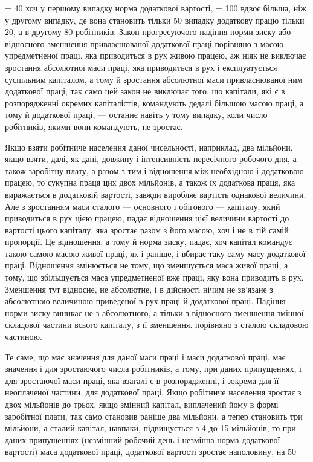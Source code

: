 = 40%
хоч у першому випадку норма додаткової вартості, = 100%
вдвоє більша, ніж у другому випадку, де вона становить тільки
50%
випадку додаткову працю тільки 20, а в другому 80 робітників.
Закон прогресуючого падіння норми зиску або відносного
зменшення привласнюваної додаткової праці порівняно з масою
упредметненої праці, яка приводиться в рух живою працею, аж
ніяк не виключає зростання абсолютної маси праці, яка приводиться
в рух і експлуатується суспільним капіталом, а тому й зростання
абсолютної маси привласнюваної ним додаткової праці; так само
цей закон не виключає того, що капітали, які є в розпорядженні
окремих капіталістів, командують дедалі більшою масою праці,
а тому й додаткової праці, — останнє навіть у тому випадку,
коли число робітників, якими вони командують, не зростає.

Якщо взяти робітниче населення даної чисельності, наприклад,
два мільйони, якщо взяти, далі, як дані, довжину і інтенсивність
пересічного робочого дня, а також заробітну плату,
а разом з тим і відношення між необхідною і додатковою працею,
то сукупна праця цих двох мільйонів, а також їх додаткова
праця, яка виражається в додатковій вартості, завжди виробляє
вартість однакової величини. Але з зростанням маси сталого
— основного і обігового — капіталу, який приводиться в рух
цією працею, падає відношення цієї величини вартості до вартості
цього капіталу, яка зростає разом з його масою, хоч і не в тій
самій пропорції. Це відношення, а тому й норма зиску, падає, хоч
капітал командує такою самою масою живої праці, як і раніше,
і вбирає таку саму масу додаткової праці. Відношення змінюється
не тому, що зменшується маса живої праці, а тому, що збільшується
маса упредметненої вже праці, яку вона приводить в рух.
Зменшення тут відносне, не абсолютне, і в дійсності нічим
не зв’язане з абсолютною величиною приведеної в рух праці
й додаткової праці. Падіння норми зиску виникає не з абсолютного,
а тільки з відносного зменшення змінної складової частини
всього капіталу, з її зменшення. порівняно з сталою складовою
частиною.

Те саме, що має значення для даної маси праці і маси додаткової
праці, має значення і для зростаючого числа робітників, а тому, при
даних припущеннях, і для зростаючої маси праці, яка взагалі
є в розпорядженні, і зокрема для її неоплаченої частини, для
додаткової праці. Якщо робітниче населення зростає з двох мільйонів
до трьох, якщо змінний капітал, виплачений йому в формі
заробітної плати, так само становив раніше два мільйони, а тепер
становить три мільйони, а сталий капітал, навпаки, підвищується
з 4 до 15 мільйонів, то при даних припущеннях (незмінний
робочий день і незмінна норма додаткової вартості) маса додаткової
праці, додаткової вартості зростає наполовину, на 50%
